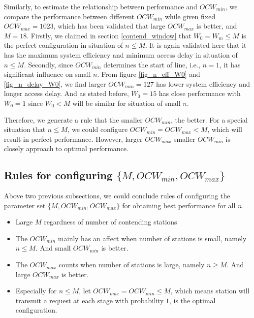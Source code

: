 Similarly, to estimate the relationship between performance and $OCW_{min}$, we compare the performance between different $OCW_{min}$ while given fixed $OCW_{max}=1023$, which has been validated that large $OCW_{max}$ is better, and $M=18$. 
Firstly, we claimed in section \ref{contend_window} that $W_0=W_m\leq M$ is the perfect configuration in situation of $n\leq M$. It is again validated here that it has the maximum system efficiency and minimum access delay in situation of $n\leq M$. 
Secondly, since $OCW_{min}$ determines the start of line, i.e., $n=1$, it has significant influence on small $n$.
From figure \ref{fig_n_eff_W0} and \ref{fig_n_delay_W0}, we find larger $OCW_{min}=127$ has lower system efficiency and longer access delay. And as stated before, $W_0=15$ has close performance with $W_0=1$ since $W_0<M$ will be similar for situation of small $n$.

Therefore, we generate a rule that the smaller $OCW_{min}$, the better.
For a special situation that $n\leq M$, we could configure $OCW_{min}=OCW_{max}<M$, which will result in perfect performance. 
However, larger $OCW_{max}$ smaller $OCW_{min}$ is closely approach to optimal performance.

\subsection{Rules for configuring $\lbrace M, OCW_{min}, OCW_{max} \rbrace$}
Above two previous subsections, we could conclude rules of configuring the parameter set $\lbrace M, OCW_{min}, OCW_{max} \rbrace$ for obtaining best performance for all $n$. 
\begin{itemize}
\item Large $M$ regardness of number of contending stations
\item The $OCW_{min}$ mainly has an affect when number of stations is small, namely $n\leq 	M$. And small $OCW_{min}$ is better.
\item The $OCW_{max}$ counts when number of stations is large, namely $n\geq M$. And large 	$OCW_{max}$ is better.
\item Especially for $n \leq M$, let $OCW_{max}=OCW_{min}\leq M$, which means station will 	transmit a request at each stage with probability $1$, is the optimal configuration.
\end{itemize}


